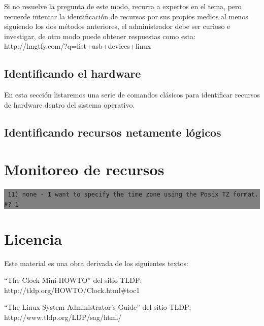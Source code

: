 \documentclass[12pt]{article}
\begin{document}
Si no resuelve la pregunta de este modo, recurra a expertos en el tema, pero recuerde
intentar la identificación de recursos por sus propios medios al menos siguiendo los dos 
métodos anteriores, el administrador debe ser curioso e investigar, de otro modo puede 
obtener respuestas como esta: http://lmgtfy.com/?q=list+usb+devices+linux

\subsection*{Identificando el hardware}
En esta sección listaremos una serie de comandos clásicos para identificar recursos de
hardware dentro del sistema operativo. 

\subsection*{Identificando recursos netamente lógicos}

\section*{Monitoreo de recursos}


\colorbox{grey}{\parbox[t]{0.95\linewidth}{ \vspace*{0.5cm} { 
{\tt 
11) none - I want to specify the time zone using the Posix TZ format.\\
\#? 1\\
}
} \vspace*{0.5cm} } } 




\section*{Licencia}

Este material es una obra derivada de los siguientes textos:

``The Clock Mini-HOWTO'' del sitio TLDP: http://tldp.org/HOWTO/Clock.html\#toc1

``The Linux System Administrator's Guide'' del sitio TLDP: http://www.tldp.org/LDP/sag/html/
\end{document}
